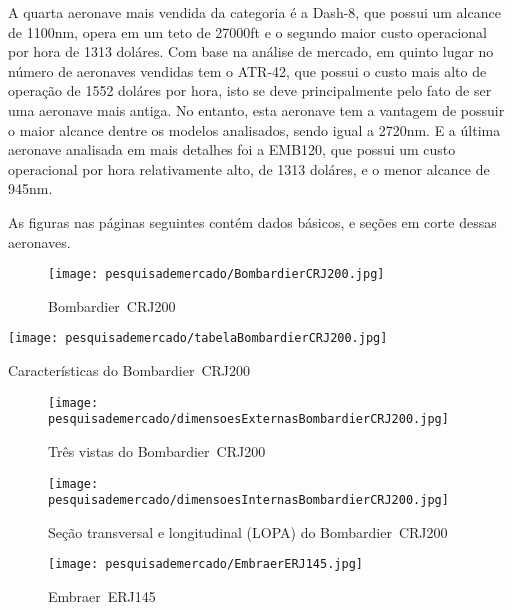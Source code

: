     A quarta aeronave mais vendida da categoria é a Dash-8, que possui um alcance de 1100nm, opera em um teto de 27000ft e o segundo maior custo operacional por hora de 1313 doláres. Com base na análise de mercado, em quinto lugar no número de aeronaves vendidas tem o ATR-42, que possui o custo mais alto de operação de 1552 doláres por hora, isto se deve principalmente pelo fato de ser uma aeronave mais antiga. No entanto, esta aeronave tem a vantagem de possuir o maior alcance dentre os modelos analisados, sendo igual a 2720nm. E a última aeronave analisada em mais detalhes foi a EMB120, que possui um custo operacional por hora relativamente alto, de 1313 doláres, e o menor alcance de 945nm. 
    
    As figuras nas páginas seguintes contém dados básicos, e seções em corte dessas aeronaves.

\clearpage

\begin{figure}[bp]
\centering
\texttt{[image: pesquisademercado/BombardierCRJ200.jpg]}
\caption{Bombardier~CRJ200}
\end{figure}

\begin{table}[bp]
\centering
\texttt{[image: pesquisademercado/tabelaBombardierCRJ200.jpg]}
\caption{Características do Bombardier~CRJ200}
\end{table}

\begin{sidewaysfigure}[p]
\texttt{[image: pesquisademercado/dimensoesExternasBombardierCRJ200.jpg]}
\caption{Três vistas do Bombardier~CRJ200}
\end{sidewaysfigure}

\begin{sidewaysfigure}[p]
\texttt{[image: pesquisademercado/dimensoesInternasBombardierCRJ200.jpg]}
\caption{Seção transversal e longitudinal (LOPA) do Bombardier~CRJ200}
\end{sidewaysfigure}

\clearpage
\begin{figure}
\centering
\texttt{[image: pesquisademercado/EmbraerERJ145.jpg]}
\caption{Embraer~ERJ145}
\end{figure}

